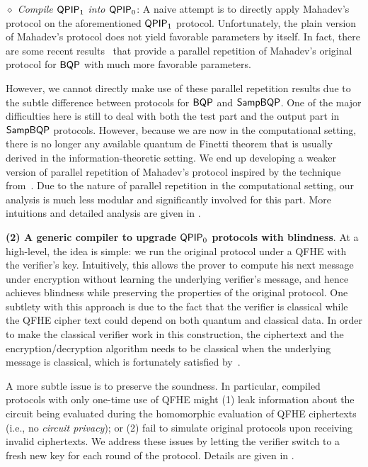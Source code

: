 \vspace{2mm} \noindent  \emph{$\diamond$ Compile $\operatorname{\mathsf{QPIP}}_1$ into $\operatorname{\mathsf{QPIP}}_0$}:
A naive attempt is to directly apply Mahadev's protocol on the aforementioned $\operatorname{\mathsf{QPIP}}_1$ protocol.
Unfortunately, the plain version of Mahadev's protocol does not yield favorable parameters by itself.
In fact, there are some recent results~\cite{arXiv:AlaChiHun19, arXiv:ChiaChungYam19} that provide a parallel repetition of Mahadev's original protocol for $\operatorname{\mathsf{BQP}}$ with
much more favorable parameters.

However, we cannot directly make use of these parallel repetition results due to the subtle difference between protocols for $\operatorname{\mathsf{BQP}}$ and $\operatorname{\mathsf{SampBQP}}$.
One of the major difficulties here is still to deal with both the test part and the output part in $\operatorname{\mathsf{SampBQP}}$ protocols.
However, because we are now in the computational setting, there is no longer any available quantum de Finetti theorem that is usually derived in the information-theoretic setting.
We end up developing a weaker version of  parallel repetition of Mahadev's protocol inspired by the technique from~\cite{arXiv:ChiaChungYam19}.
Due to the nature of parallel repetition in the computational setting, our analysis is much less modular and significantly involved for this part.  
More intuitions and detailed analysis are given in .

\vspace{2mm} \noindent \textbf{(2) A generic compiler to upgrade $\operatorname{\mathsf{QPIP}}_0$ protocols with blindness}. At a high-level, the idea is simple: we run the original protocol under a QFHE with the verifier's key. Intuitively, this allows the prover to compute his next message under encryption without learning the underlying verifier's message, and hence achieves blindness while preserving the properties of the original protocol.
One subtlety with this approach is due to the fact that the verifier is classical while the QFHE cipher text could depend on both quantum and classical data.
In order to make the classical verifier work in this construction, the ciphertext and the encryption/decryption algorithm needs to be classical when the underlying message is classical, which is fortunately satisfied by~\cite{mahadev_qfhe}.

A more subtle issue is to preserve the soundness.
In particular, compiled protocols with only one-time use of QFHE might (1) leak information about the circuit being evaluated during the homomorphic evaluation of QFHE ciphertexts (i.e., no \emph{circuit privacy});
or (2) fail to simulate original protocols upon receiving invalid ciphertexts.
We address these issues by letting the verifier switch to a fresh new key for each round of the protocol.
Details are given in .

